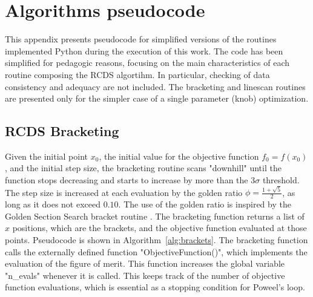 \chapter{Algorithms pseudocode}
\label{chap:pseudocode}
This appendix presents pseudocode for simplified versions of the routines implemented Python during the execution of this work. The code has been simplified for pedagogic reasons, focusing on the main characteristics of each routine composing the RCDS algortihm. In particular, checking of data consistency and adequacy are not included. The bracketing and linescan routines are presented only for the simpler case of a single parameter (knob) optimization.
\section{RCDS Bracketing}
Given the initial point $x_0$, the initial value for the objective function $f_0 = f(x_0)$, and the initial step size, the bracketing routine scans "downhill" until the function stops decreasing and starts to increase by more than the $3\sigma$ threshold. The step size is increased at each evaluation by the golden ratio $\phi=\frac{1+\sqrt{5}}{2}$, as long as it does not exceed $0.10$. The use of the golden ratio is inspired by the Golden Section Search bracket routine \cite[sec. 10.2]{press_numerical_2007}. The bracketing function returns a list of $x$ positions, which are the brackets, and the objective function evaluated at those points. Pseudocode is shown in Algorithm~\ref{alg:brackets}. The bracketing function calls the externally defined function "ObjectiveFunction()", which implements the evaluation of the figure of merit. This function increases the global variable "n\_evals" whenever it is called. This keeps track of the number of objective function evaluations, which is essential as a stopping condition for Poweel's loop.

